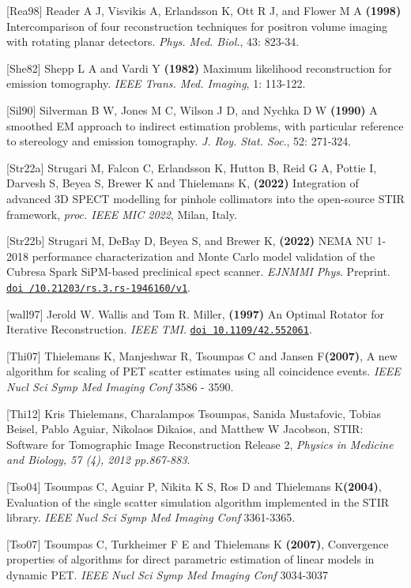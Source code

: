 \documentclass{article}
\def\url#1#2{\mbox{\href{#1}{\tt #2}}}
\begin{document}
{{{{{{ {[}Rea98] Reader A J, Visvikis A, Erlandsson K, Ott R J, and Flower 
M A \textbf{(1998)} Intercomparison of four reconstruction techniques 
for positron volume imaging with rotating planar detectors. \textit{Phys. 
Med. Biol.}, 43: 823-34.

{[}She82] Shepp L A and Vardi Y \textbf{(1982)} Maximum likelihood reconstruction 
for emission tomography. \textit{IEEE Trans. Med. Imaging}, 1: 113-122.

{[}Sil90] Silverman B W, Jones M C, Wilson J D, and Nychka D W \textbf{(1990)} 
A smoothed EM approach to indirect estimation problems, with 
particular reference to stereology and emission tomography. \textit{J. 
Roy. Stat. Soc}., 52: 271-324. 

[Str22a] Strugari M, Falcon C, Erlandsson K, Hutton B, Reid G A, Pottie I, Darvesh S, Beyea S, Brewer K and Thielemans K, \textbf{(2022)} Integration of advanced 3D SPECT modelling for pinhole collimators into the open-source STIR framework, \textit{proc. IEEE MIC 2022}, Milan, Italy.

[Str22b] Strugari M, DeBay D, Beyea S, and Brewer K, \textbf{(2022)} NEMA NU 1-2018 performance characterization and Monte Carlo model validation 
of the Cubresa Spark SiPM-based preclinical spect scanner. \textit{EJNMMI Phys}. Preprint. \url{https://doi.org/10.21203/rs.3.rs-1946160/v1}{doi /10.21203/rs.3.rs-1946160/v1}.

[wall97] Jerold W. Wallis and Tom R. Miller, \textbf{(1997)} An Optimal Rotator for Iterative Reconstruction. \textit{IEEE TMI}.  \url{https://ieeexplore.ieee.org/stamp/stamp.jsp?tp=&arnumber=552061}{doi 10.1109/42.552061}.

{[}Thi07{]} Thielemans K, Manjeshwar R, Tsoumpas C and Jansen F\textbf{(2007)}, 
A new algorithm for scaling of PET scatter estimates using all coincidence events. 
\textit { IEEE Nucl Sci Symp Med Imaging Conf } 3586 - 3590.

{[}Thi12] Kris Thielemans, Charalampos Tsoumpas, Sanida Mustafovic, Tobias Beisel, Pablo Aguiar, Nikolaos Dikaios, and Matthew W Jacobson,
STIR: Software for Tomographic Image Reconstruction Release 2,
\textit{Physics in Medicine and Biology, 57 (4), 2012 pp.867-883}.

{[}Tso04{]} Tsoumpas C, Aguiar P, Nikita K S, Ros D and Thielemans K\textbf{(2004)}, 
Evaluation of the single scatter simulation algorithm implemented in the STIR library. 
\textit { IEEE Nucl Sci Symp Med Imaging Conf } 3361-3365.

{[}Tso07{]} Tsoumpas C, Turkheimer F E and Thielemans K  \textbf{(2007)}, 
Convergence properties of algorithms for direct parametric estimation of linear models in dynamic PET. 
\textit{IEEE Nucl Sci Symp Med Imaging Conf} 3034-3037

}}}}}}
\end{document}
